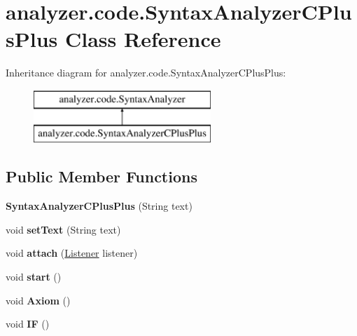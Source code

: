 \hypertarget{classanalyzer_1_1code_1_1SyntaxAnalyzerCPlusPlus}{}\section{analyzer.\+code.\+Syntax\+Analyzer\+C\+Plus\+Plus Class Reference}
\label{classanalyzer_1_1code_1_1SyntaxAnalyzerCPlusPlus}
Inheritance diagram for analyzer.\+code.\+Syntax\+Analyzer\+C\+Plus\+Plus\+:\begin{figure}[H]
\begin{center}
\leavevmode
\includegraphics[height=2.000000cm]{classanalyzer_1_1code_1_1SyntaxAnalyzerCPlusPlus}
\end{center}
\end{figure}
\subsection*{Public Member Functions}
\begin{DoxyCompactItemize}
\item 
\mbox{\label{classanalyzer_1_1code_1_1SyntaxAnalyzerCPlusPlus_a62ecabba5c6989ef558f0a991b3798a7}} 
{\bfseries Syntax\+Analyzer\+C\+Plus\+Plus} (String text)
\item 
\mbox{\label{classanalyzer_1_1code_1_1SyntaxAnalyzerCPlusPlus_ab687e2baba100eb38b3e0df3f68a2927}} 
void {\bfseries set\+Text} (String text)
\item 
\mbox{\label{classanalyzer_1_1code_1_1SyntaxAnalyzerCPlusPlus_ac016b5fa6a0eef248a16601c940af7a8}} 
void {\bfseries attach} (\hyperlink{classanalyzer_1_1code_1_1Listener}{Listener} listener)
\item 
\mbox{\label{classanalyzer_1_1code_1_1SyntaxAnalyzerCPlusPlus_a09c25e5223e8fd584b3bc01da4da8dc1}} 
void {\bfseries start} ()
\item 
\mbox{\label{classanalyzer_1_1code_1_1SyntaxAnalyzerCPlusPlus_a1f158c1f95c1835f4f0d6613d907bfe5}} 
void {\bfseries Axiom} ()
\item 
\mbox{\label{classanalyzer_1_1code_1_1SyntaxAnalyzerCPlusPlus_af226bd1ed332b7b5657dca919246ee46}} 
void {\bfseries IF} ()
\end{DoxyCompactItemize}
